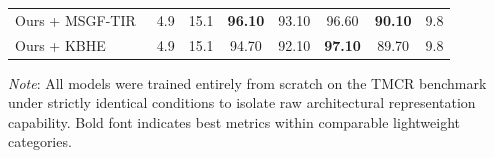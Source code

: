 \begin{table}[t]
\begin{tabular}{l c c c c c c c}
\rowcolor{gray!06}
Ours + MSGF-TIR~\cite{li2024thermal} & 4.9 & 15.1 & \textbf{96.10} & 93.10 & 96.60 & \textbf{90.10} & 9.8 \\
\rowcolor{gray!06}
Ours + KBHE~\cite{mudavath2025person}  & 4.9 & 15.1 & 94.70 & 92.10 & \textbf{97.10} & 89.70 & 9.8 \\
\bottomrule
\end{tabular}
\vspace{1ex}
{\raggedright \footnotesize \textit{Note}: All models were trained entirely from scratch on the TMCR benchmark under strictly identical conditions to isolate raw architectural representation capability. Bold font indicates best metrics within comparable lightweight categories.\par}
\end{table}
